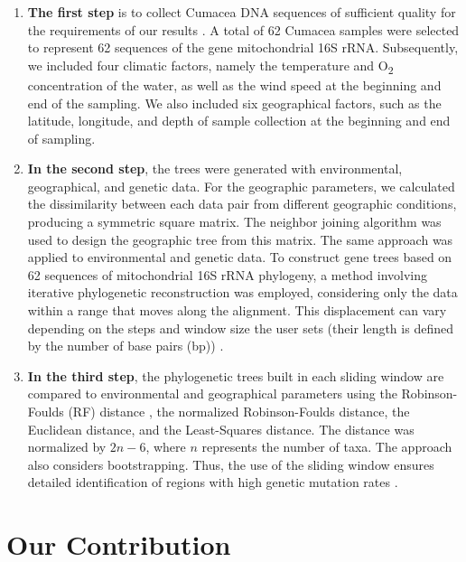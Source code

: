 \begin{enumerate}
\item \textbf{The first step} is to collect Cumacea DNA sequences of sufficient quality for the requirements of our results \citep{koshkarov_phylogeography_2022}. A total of 62 Cumacea samples were selected to represent 62 sequences of the gene mitochondrial 16S rRNA. Subsequently, we included four climatic factors, namely the temperature and O\textsubscript{2} concentration of the water, as well as the wind speed at the beginning and end of the sampling. We also included six geographical factors, such as the latitude, longitude, and depth of sample collection at the beginning and end of sampling.

\item \textbf{In the second step}, the trees were generated with environmental, geographical, and genetic data. For the geographic parameters, we calculated the dissimilarity between each data pair from different geographic conditions, producing a symmetric square matrix. The neighbor joining algorithm was used to design the geographic tree from this matrix. The same approach was applied to environmental and genetic data. To construct gene trees based on 62 sequences of mitochondrial 16S rRNA phylogeny, a method involving iterative phylogenetic reconstruction was employed, considering only the data within a range that moves along the alignment. This displacement can vary depending on the steps and window size the user sets (their length is defined by the number of base pairs (bp)) \citep{koshkarov_phylogeography_2022}.

\item \textbf{In the third step}, the phylogenetic trees built in each sliding window are compared to environmental and geographical parameters using the Robinson-Foulds (RF) distance \citep{robinson_comparison_1981, koshkarov_phylogeography_2022}, the normalized Robinson-Foulds distance, the Euclidean distance, and the Least-Squares distance. The distance was normalized by $2n-6$, where $n$ represents the number of taxa. The approach also considers bootstrapping. Thus, the use of the sliding window ensures detailed identification of regions with high genetic mutation rates \citep{koshkarov_phylogeography_2022}.
\end{enumerate}

\section{Our Contribution}

